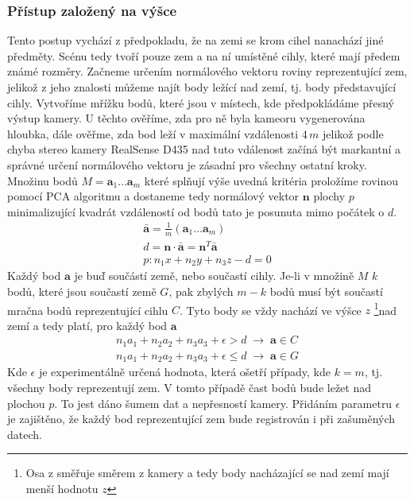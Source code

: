 \documentclass[twoside]{ctuthesis}
\newcommand{\tl}[1]{$\mathbf{#1}$}
\begin{document}
\subsubsection{Přístup založený na výšce}
\label{subsec:height}
Tento postup vychází z předpokladu, že na zemi se krom cihel nanachází jiné předměty. Scénu tedy tvoří pouze zem a na ní umístěné cihly, které mají předem známé rozměry. Začneme určením normálového vektoru roviny reprezentující zem, jelikož z jeho znalosti můžeme najít body ležící nad zemí, tj. body představující cihly. 
Vytvoříme mřížku bodů, které jsou v místech, kde předpokládáme přesný výstup kamery. U těchto ověříme, zda pro ně byla kameoru vygenerována hloubka, dále ověřme, zda bod leží v maximální vzdálenosti 4\,$m$ jelikož podle \cite{keselman2017intel}  chyba stereo kamery RealSense D435 nad tuto vdálenost začíná být markantní a správné určení normálového vektoru je zásadní pro všechny ostatní kroky. Množinu bodů $M = \mathbf{a}_1 \dotsc \mathbf{a}_m$ které splňují výše uvedná kritéria proložíme rovinou pomocí PCA algoritmu a dostaneme tedy normálový vektor \tl{n} plochy $p$ minimalizující kvadrát vzdáleností od bodů tato je posunuta mimo počátek o $d$.
\begin{align}
    \mathbf{\bar{a}} = \frac{1}{m}\left( \mathbf{a}_1 \dotsc \mathbf{a}_m \right) \\
    d = \mathbf{n} \cdot \mathbf{\bar{a}} = \mathbf{n}^T \mathbf{\bar{a}} \\
    p: n_1x + n_2y + n_3z - d = 0 \label{normal_plane}
\end{align}
Každý bod \tl{a} je buď součástí země, nebo součastí cihly. Je-li v množině $M$ $k$ bodů, které jsou součastí země $G$, pak zbylých $m - k$ bodů musí být součastí mračna bodů reprezentující cihlu $C$. Tyto body se vždy nachází ve výšce $z$ \footnote{Osa z směřuje směrem z kamery a tedy body nacházající se nad zemí mají menší hodnotu $z$}nad zemí a tedy platí, pro každý bod \tl{a}
\begin{align}
    n_1a_1 + n_2a_2 + n_3a_3 + \epsilon > d \; \rightarrow \; \mathbf{a} \in C  \\
    n_1a_1 + n_2a_2 + n_3a_3 + \epsilon \leq d \; \rightarrow \; \mathbf{a} \in G  
\end{align}
Kde $\epsilon$ je experimentálně určená hodnota, která ošetří případy, kde $k = m$, tj. všechny body reprezentují zem. V tomto případě čast bodů bude ležet nad plochou $p$. To jest dáno šumem dat a nepřesností kamery. Přidáním parametru $\epsilon$ je zajištěno, že každý bod reprezentující zem bude registrován i při zašuměných datech.
\end{document}
